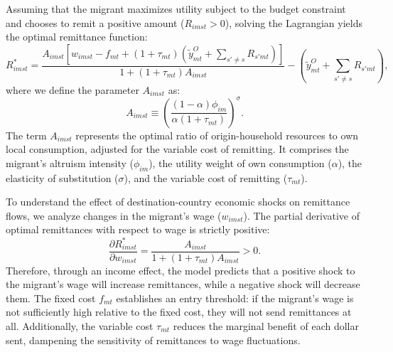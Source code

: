 \par

Assuming that the migrant maximizes utility subject to the budget constraint and chooses to remit a positive amount ($R_{imst} > 0$), solving the Lagrangian yields the optimal remittance function:
\begin{equation}
    R^{*}_{imst}
    =
    \frac{
    A_{imst}
    \left[
    w_{imst}
    -
    f_{mt}
    +
    (1+\tau_{mt})
    \left(
    \tilde{y}^O_{mt}
    +
    \sum_{s' \neq s} R_{s'mt}
    \right)
    \right]
    }{
    1+(1+\tau_{mt})A_{imst}
    }
    -
    \left(
    \tilde{y}^O_{mt}
    +
    \sum_{s' \neq s} R_{s'mt}
    \right),
\end{equation}
where we define the parameter $A_{imst}$ as:
\begin{equation}
    A_{imst}
    \equiv
    \left(
    \frac{(1-\alpha)\phi_{im}}
    {\alpha(1+\tau_{mt})}
    \right)^{\sigma}.
\end{equation}
The term $A_{imst}$ represents the optimal ratio of origin-household resources to own local consumption, adjusted for the variable cost of remitting. It comprises the migrant's altruism intensity ($\phi_{im}$), the utility weight of own consumption ($\alpha$), the elasticity of substitution ($\sigma$), and the variable cost of remitting ($\tau_{mt}$).

\par

To understand the effect of destination-country economic shocks on remittance flows, we analyze changes in the migrant's wage ($w_{imst}$). The partial derivative of optimal remittances with respect to wage is strictly positive:
\begin{equation}
    \frac{\partial R^*_{imst}}{\partial w_{imst}}
    =
    \frac{A_{imst}}{1 + (1 + \tau_{mt})A_{imst}}
    >
    0.
\end{equation}
Therefore, through an income effect, the model predicts that a positive shock to the migrant's wage will increase remittances, while a negative shock will decrease them. The fixed cost $f_{mt}$ establishes an entry threshold: if the migrant's wage is not sufficiently high relative to the fixed cost, they will not send remittances at all. Additionally, the variable cost $\tau_{mt}$ reduces the marginal benefit of each dollar sent, dampening the sensitivity of remittances to wage fluctuations.

\par

